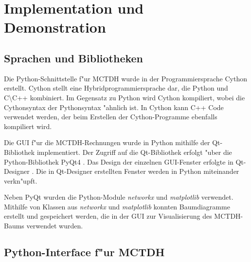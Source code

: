 \chapter{Implementation und Demonstration}
\label{cha:Implementation}

\section{Sprachen und Bibliotheken}

Die Python-Schnittstelle f"ur MCTDH wurde in der Programmiersprache Cython \cite{PyArt} erstellt. 
Cython stellt eine Hybridprogrammiersprache dar,
die Python und C\textbackslash C++ kombiniert. Im Gegensatz zu Python
wird Cython kompiliert, wobei die Cythonsyntax der Pythonsyntax "ahnlich ist.
In Cython kann C++ Code verwendet werden, der beim Erstellen der Cython-Programme ebenfalls kompiliert wird.

Die GUI f"ur die MCTDH-Rechnungen wurde in Python mithilfe der Qt-Bibliothek \cite{Qt} implementiert.
Der Zugriff auf die Qt-Bibliothek  erfolgt "uber die Python-Bibliothek PyQt4 \cite{PyQt}. 
Das Design der einzelnen GUI-Fenster erfolgte in Qt-Designer \cite{Qt-Designer}. 
Die in Qt-Designer erstellten Fenster werden in Python miteinander verkn"upft.

Neben PyQt wurden die Python-Module \textit{networkx} \cite{SciPyProceedings_11} und \textit{matplotlib} \cite{Hunter:2007} verwendet.
Mithilfe von Klassen aus \textit{networkx} und \textit{matplotlib} konnten Baumdiagramme erstellt und gespei\-chert werden, die in der GUI zur 
Visualisierung des MCTDH-Baums verwendet wurden.

\section{Python-Interface f"ur MCTDH}
\label{sec:PyInterface}

